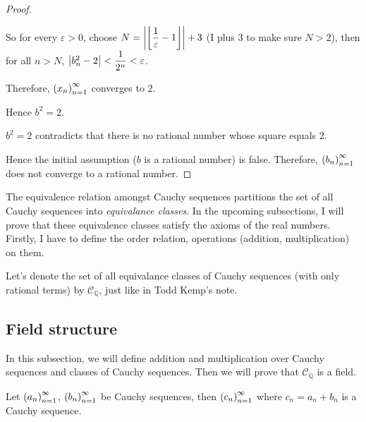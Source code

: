 \begin{proof}
\begin{enumerate}[label={\textbf{Step \arabic*.}},itemindent=1cm]
              So for every $\varepsilon > 0$, choose $N = \left\vert{\left\lfloor{\dfrac{1}{\varepsilon} - 1}\right\rfloor}\right\vert + 3$ (I plus 3 to make sure $N > 2$), then for all $n > N$, $\left\vert{b^{2}_{n} - 2}\right\vert < \dfrac{1}{2^{n}} < \varepsilon$.

              Therefore, ${\left({x_{n}}\right)}^{\infty}_{n=1}$ converges to $2$.

              Hence $b^{2} = 2$.
    \end{enumerate}

    $b^{2} = 2$ contradicts that there is no rational number whose square equals $2$.

    Hence the initial assumption ($b$ is a rational number) is false. Therefore, ${\left({b_{n}}\right)}^{\infty}_{n=1}$ does not converge to a rational number.
\end{proof}

The equivalence relation amongst Cauchy sequences partitions the set of all Cauchy sequences into \textit{equivalance classes}. In the upcoming subsections, I will prove that these equivalence classes satisfy the axioms of the real numbers. Firstly, I have to define the order relation, operations (addition, multiplication) on them.

Let's denote the set of all equivalance classes of Cauchy sequences (with only rational terms) by $\mathscr{C}_{\mathbb{Q}}$, just like in Todd Kemp's note.

\subsection{Field structure}

In this subsection, we will define addition and multiplication over Cauchy sequences and classes of Cauchy sequences. Then we will prove that $\mathscr{C}_{\mathbb{Q}}$ is a field.

\begin{theorem}\label{theorem:chapter1:sum-of-cauchy-sequences}
    Let ${\left({a_{n}}\right)}^{\infty}_{n=1}$, ${\left({b_{n}}\right)}^{\infty}_{n=1}$ be Cauchy sequences, then ${\left({c_{n}}\right)}^{\infty}_{n=1}$ where $c_{n} = a_{n} + b_{n}$ is a Cauchy sequence.
\end{theorem}

